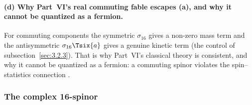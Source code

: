 \paragraph{(d) Why Part~VI's real commuting fable escapes (a), and why it cannot be quantized as a
fermion.} For commuting components the symmetric $\sigma_{16}$ gives a non-zero mass term and the
antisymmetric $\sigma_{16}\Tsix{a}$ gives a genuine kinetic term (the control of
subsection~\ref{sec:3.2.3}). That is why Part~VI's classical theory is consistent, and why it cannot be
quantized as a fermion: a commuting spinor violates the spin--statistics connection
.

\subsubsection{The complex 16-spinor}
\label{sec:3.2.5}

